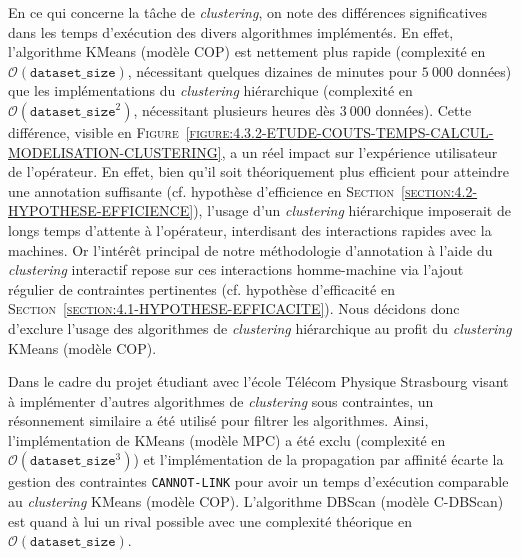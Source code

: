 			En ce qui concerne la tâche de \textit{clustering}, on note des différences significatives dans les temps d'exécution des divers algorithmes implémentés.
			En effet, l'algorithme KMeans (modèle COP) est nettement plus rapide (complexité en $ \mathcal{O}(\texttt{dataset\_size}) $, nécessitant quelques dizaines de minutes pour $5~000$ données) que les implémentations du \textit{clustering} hiérarchique (complexité en $ \mathcal{O}(\texttt{dataset\_size}^{2}) $, nécessitant plusieurs heures dès $3~000$ données).
			Cette différence, visible en \textsc{Figure~\ref{figure:4.3.2-ETUDE-COUTS-TEMPS-CALCUL-MODELISATION-CLUSTERING}}, a un réel impact sur l'expérience utilisateur de l'opérateur.
			En effet, bien qu'il soit théoriquement plus efficient pour atteindre une annotation suffisante (cf. hypothèse d'efficience en \textsc{Section~\ref{section:4.2-HYPOTHESE-EFFICIENCE}}), l'usage d'un \textit{clustering} hiérarchique imposerait de longs temps d'attente à l'opérateur, interdisant des interactions rapides avec la machines.
			Or l'intérêt principal de notre méthodologie d'annotation à l'aide du \textit{clustering} interactif repose sur ces interactions homme-machine via l'ajout régulier de contraintes pertinentes (cf. hypothèse d'efficacité en \textsc{Section~\ref{section:4.1-HYPOTHESE-EFFICACITE}}).
			Nous décidons donc d'exclure l'usage des algorithmes de \textit{clustering} hiérarchique au profit du \textit{clustering} KMeans (modèle COP).
			
			\begin{leftBarInformation}
				Dans le cadre du projet étudiant avec l'école Télécom Physique Strasbourg visant à implémenter d'autres algorithmes de \textit{clustering} sous contraintes, un résonnement similaire a été utilisé pour filtrer les algorithmes. Ainsi, l'implémentation de KMeans (modèle MPC) a été exclu (complexité en $ \mathcal{O}(\texttt{dataset\_size}^{3}) $) et l'implémentation de la propagation par affinité écarte la gestion des contraintes \texttt{CANNOT-LINK} pour avoir un temps d'exécution comparable au \textit{clustering} KMeans (modèle COP). L'algorithme DBScan (modèle C-DBScan) est quand à lui un rival possible avec une complexité théorique en $ \mathcal{O}(\texttt{dataset\_size}) $.
			\end{leftBarInformation}
			
